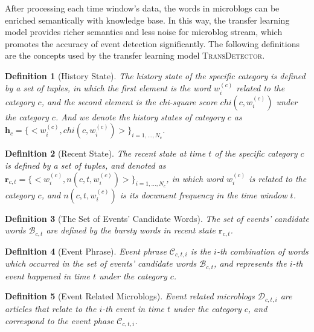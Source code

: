 \documentclass[runningheads,a4paper]{llncs}
\newtheorem{rmk}{Definition}%
\begin{document}
After processing each time window's data, the words in microblogs can be enriched semantically with knowledge base.
In this way, the transfer learning model provides richer semantics and less noise for microblog stream, which promotes the accuracy of event detection significantly. 
The following definitions are the concepts used by the transfer learning model \textsc{TransDetector}. 

\begin{rmk}[History State] 
The history state of the specific category is defined by a set of tuples, in which the first element is the word \(w^{(c)}_i\) related to the category \(c\), and the second element is the chi-square score \(chi(c,w^{(c)}_{i})\) under the category \(c\). 
And we denote the history states of category \(c\) as \(\bm{h}_c=\{<w^{(c)}_i,chi(c,w^{(c)}_{i})>\}_{i=1,...,N_c}\).
\end{rmk}

\begin{rmk}[Recent State] 
The recent state at time \(t\) of the specific category \(c\) is defined by a set of tuples, and denoted as \(\bm{r}_{c,t}=\{<w^{(c)}_i,n(c,t,w^{(c)}_{i})>\}_{i=1,...,N_c}\), in which word \(w^{(c)}_{i}\) is related to the category \(c\), and \(n(c,t,w^{(c)}_{i})\) is its document frequency in the time window \(t\).
\end{rmk}

\begin{rmk}[The Set of Events' Candidate Words] 
The set of events' candidate words \(\mathcal{B}_{c,t}\) are defined by the bursty words in recent state \(\bm{r}_{c,t}\).
\end{rmk}

\begin{rmk}[Event Phrase] 
Event phrase \(\mathcal{C}_{c,t,i}\) is the \(i\)-th combination of words which occurred in the set of events' candidate words \(\mathcal{B}_{c,t}\), and represents the \(i\)-th event happened in time \(t\) under the category \(c\).
\end{rmk}

\begin{rmk}[Event Related Microblogs] Event related microblogs \(\mathcal{D}_{c,t,i}\) are articles that relate to the \(i\)-th event in time \(t\) under the category \(c\), and correspond to the event phase \(\mathcal{C}_{c,t,i}\).
\end{rmk}
\end{document}
